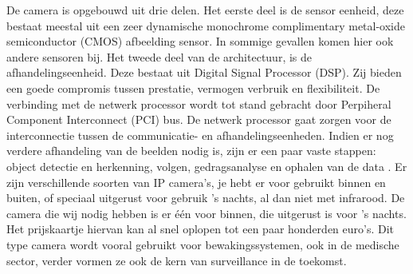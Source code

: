De camera is opgebouwd uit drie delen. Het eerste deel is de sensor eenheid, deze bestaat meestal uit een zeer dynamische monochrome complimentary metal-oxide semiconductor (CMOS) afbeelding sensor. In sommige gevallen komen hier ook andere sensoren bij. Het tweede deel van de architectuur, is de afhandelingseenheid. Deze bestaat uit Digital Signal Processor (DSP). Zij bieden een goede compromis tussen prestatie, vermogen verbruik en flexibiliteit.  De verbinding met de netwerk processor wordt tot stand gebracht door Perpiheral Component Interconnect (PCI) bus. De netwerk processor gaat zorgen voor de interconnectie tussen de communicatie- en afhandelingseenheden. Indien er nog verdere afhandeling van de beelden nodig is, zijn er een paar vaste stappen: object detectie en herkenning, volgen, gedragsanalyse en ophalen van de data \cite{bibIPC2}. Er zijn verschillende soorten van IP camera's, je hebt er voor gebruikt binnen en buiten, of speciaal uitgerust voor gebruik 's nachts, al dan niet met infrarood. De camera die wij nodig hebben is er \'e\'en voor binnen, die uitgerust is voor 's nachts. Het prijskaartje hiervan kan al snel oplopen tot een paar honderden euro's. Dit type camera wordt vooral gebruikt voor bewakingssystemen, ook in de medische sector, verder vormen ze ook de kern van surveillance in de toekomst.

